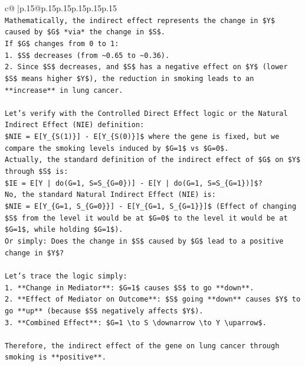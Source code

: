 \documentclass{article}
\begin{document}
{\begin{supertabular}{c@{$\;$}|p{.15\linewidth}@{}p{.15\linewidth}p{.15\linewidth}p{.15\linewidth}p{.15\linewidth}p{.15\linewidth}}
{{{\\ 
\texttt{Mathematically, the indirect effect represents the change in \$Y\$ caused by \$G\$ *via* the change in \$S\$.} \\
\texttt{If \$G\$ changes from 0 to 1:} \\
\texttt{1.  \$S\$ decreases (from \textasciitilde{}0.65 to \textasciitilde{}0.36).} \\
\texttt{2.  Since \$S\$ decreases, and \$S\$ has a negative effect on \$Y\$ (lower \$S\$ means higher \$Y\$), the reduction in smoking leads to an **increase** in lung cancer.} \\
\\ 
\texttt{Let's verify with the Controlled Direct Effect logic or the Natural Indirect Effect (NIE) definition:} \\
\texttt{\$NIE = E{[}Y\_\{S(1)\}{]} {-} E{[}Y\_\{S(0)\}{]}\$ where the gene is fixed, but we compare the smoking levels induced by \$G=1\$ vs \$G=0\$.} \\
\texttt{Actually, the standard definition of the indirect effect of \$G\$ on \$Y\$ through \$S\$ is:} \\
\texttt{\$IE = E{[}Y | do(G=1, S=S\_\{G=0\}){]} {-} E{[}Y | do(G=1, S=S\_\{G=1\}){]}\$?} \\
\texttt{No, the standard Natural Indirect Effect (NIE) is:} \\
\texttt{\$NIE = E{[}Y\_\{G=1, S\_\{G=0\}\}{]} {-} E{[}Y\_\{G=1, S\_\{G=1\}\}{]}\$ (Effect of changing \$S\$ from the level it would be at \$G=0\$ to the level it would be at \$G=1\$, while holding \$G=1\$).} \\
\texttt{Or simply: Does the change in \$S\$ caused by \$G\$ lead to a positive change in \$Y\$?} \\
\\ 
\texttt{Let's trace the logic simply:} \\
\texttt{1.  **Change in Mediator**: \$G=1\$ causes \$S\$ to go **down**.} \\
\texttt{2.  **Effect of Mediator on Outcome**: \$S\$ going **down** causes \$Y\$ to go **up** (because \$S\$ negatively affects \$Y\$).} \\
\texttt{3.  **Combined Effect**: \$G=1 \textbackslash{}to S \textbackslash{}downarrow \textbackslash{}to Y \textbackslash{}uparrow\$.} \\
\\ 
\texttt{Therefore, the indirect effect of the gene on lung cancer through smoking is **positive**.} \\
\\ 
}}}
\end{supertabular}}
\end{document}
